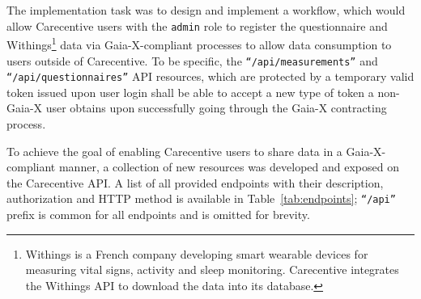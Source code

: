 The implementation task was to design and implement a workflow, which would allow Carecentive users with the \texttt{admin} role to register the questionnaire and Withings\footnote{Withings is a French company developing smart wearable devices for measuring vital signs, activity and sleep monitoring. Carecentive integrates the Withings API to download the data into its database.} data via Gaia-X-compliant processes to allow data consumption to users outside of Carecentive.
To be specific, the \texttt{``/api/measurements''} and \texttt{``/api/questionnaires''} API resources, which are protected by a temporary valid token issued upon user login shall be able to accept a new type of token a non-Gaia-X user obtains upon successfully going through the Gaia-X contracting process.

To achieve the goal of enabling Carecentive users to share data in a Gaia-X-compliant manner, a collection of new resources was developed and exposed on the Carecentive API.
A list of all provided endpoints with their description, authorization and HTTP method is available in Table~\ref{tab:endpoints}; \texttt{``/api''} prefix is common for all endpoints and is omitted for brevity.

